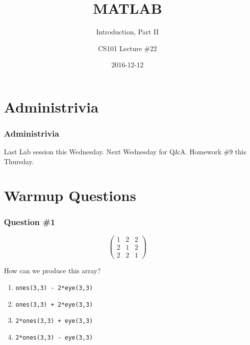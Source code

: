 \documentclass[11pt]{beamer}
\title{MATLAB}
\subtitle{Introduction, Part II}
\author{CS101 Lecture \#22}
\date{2016-12-12}
\begin{document}
  \setcounter{showProgressBar}{0}
  \setcounter{showSlideNumbers}{0}

\frame{\titlepage}

\setcounter{framenumber}{0}
\setcounter{showProgressBar}{1}
\setcounter{showSlideNumbers}{1}

\section{Administrivia}

\begin{frame}
  \frametitle{Administrivia}
  \Enlarge

  \begin{itemize}
  \myitem  Last Lab session this Wednesday.
  \myitem  Next Wednesday for Q\&A.
  \myitem  Homework \#9 this Thursday.
  \end{itemize}
\end{frame}

\section{Warmup Questions}

\begin{frame}[fragile]
  \frametitle{Question \#1}
  \Enlarge
$$
\left(
\begin{array}{ccc}
1 & 2 & 2 \\
2 & 1 & 2 \\
2 & 2 & 1
\end{array}
\right)
$$

How can we produce this array?

  \begin{enumerate}[label=\Alph*]
    \item  \texttt{ones(3,3) - 2*eye(3,3)}
    \item  \texttt{ones(3,3) + 2*eye(3,3)}
    \item  \texttt{2*ones(3,3) + eye(3,3)}
    \item  \texttt{2*ones(3,3) - eye(3,3)}
  \end{enumerate}
\end{frame}
\end{document}
